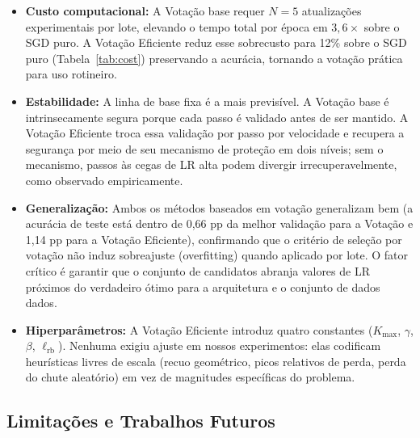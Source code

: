 \documentclass[conference]{IEEEtran}
\begin{document}
\begin{itemize}
\item \textbf{Custo computacional:} A Votação base requer $N = 5$ atualizações experimentais por lote, elevando o tempo total por época em $3,6\times$ sobre o SGD puro. A Votação Eficiente reduz esse sobrecusto para 12\% sobre o SGD puro (Tabela~\ref{tab:cost}) preservando a acurácia, tornando a votação prática para uso rotineiro.
\item \textbf{Estabilidade:} A linha de base fixa é a mais previsível. A Votação base é intrinsecamente segura porque cada passo é validado antes de ser mantido. A Votação Eficiente troca essa validação por passo por velocidade e recupera a segurança por meio de seu mecanismo de proteção em dois níveis; sem o mecanismo, passos às cegas de LR alta podem divergir irrecuperavelmente, como observado empiricamente.
\item \textbf{Generalização:} Ambos os métodos baseados em votação generalizam bem (a acurácia de teste está dentro de 0,66 pp da melhor validação para a Votação e 1,14 pp para a Votação Eficiente), confirmando que o critério de seleção por votação não induz sobreajuste (overfitting) quando aplicado por lote. O fator crítico é garantir que o conjunto de candidatos abranja valores de LR próximos do verdadeiro ótimo para a arquitetura e o conjunto de dados dados.
\item \textbf{Hiperparâmetros:} A Votação Eficiente introduz quatro constantes ($K_{\max}$, $\gamma$, $\beta$, $\ell_{\mathrm{rb}}$). Nenhuma exigiu ajuste em nossos experimentos: elas codificam heurísticas livres de escala (recuo geométrico, picos relativos de perda, perda do chute aleatório) em vez de magnitudes específicas do problema.
\end{itemize}

\subsection{Limitações e Trabalhos Futuros}
\end{document}

